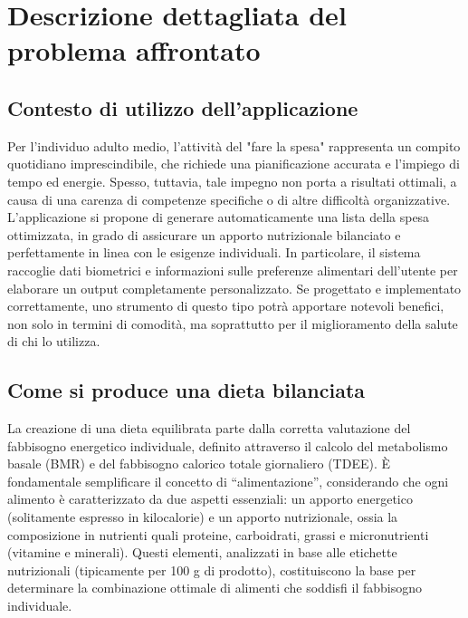\documentclass[11pt,a4paper]{article}
\begin{document}
\section{Descrizione dettagliata del problema affrontato}

\subsection{Contesto di utilizzo dell’applicazione}
Per l'individuo adulto medio, l'attività del "fare la spesa" rappresenta un compito quotidiano imprescindibile, che richiede una pianificazione accurata e l'impiego di tempo ed energie. Spesso, tuttavia, tale impegno non porta a risultati ottimali, a causa di una carenza di competenze specifiche o di altre difficoltà organizzative.\\[0.5em]
L'applicazione si propone di generare automaticamente una lista della spesa ottimizzata, in grado di assicurare un apporto nutrizionale bilanciato e perfettamente in linea con le esigenze individuali. In particolare, il sistema raccoglie dati biometrici e informazioni sulle preferenze alimentari dell'utente per elaborare un output completamente personalizzato. Se progettato e implementato correttamente, uno strumento di questo tipo potrà apportare notevoli benefici, non solo in termini di comodità, ma soprattutto per il miglioramento della salute di chi lo utilizza.

\subsection{Come si produce una dieta bilanciata}
La creazione di una dieta equilibrata parte dalla corretta valutazione del fabbisogno energetico individuale, definito attraverso il calcolo del metabolismo basale (BMR) e del fabbisogno calorico totale giornaliero (TDEE). È fondamentale semplificare il concetto di ``alimentazione'', considerando che ogni alimento è caratterizzato da due aspetti essenziali: un apporto energetico (solitamente espresso in kilocalorie) e un apporto nutrizionale, ossia la composizione in nutrienti quali proteine, carboidrati, grassi e micronutrienti (vitamine e minerali). Questi elementi, analizzati in base alle etichette nutrizionali (tipicamente per 100 g di prodotto), costituiscono la base per determinare la combinazione ottimale di alimenti che soddisfi il fabbisogno individuale.
\end{document}
